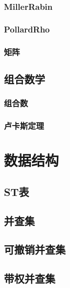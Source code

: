 \subsubsection{MillerRabin}


\subsubsection{PollardRho}


\subsubsection{矩阵}

\subsection{组合数学}
\subsubsection{组合数}

\subsubsection{卢卡斯定理}


\section{数据结构}
\subsection{ST表}


\subsection{并查集}


\subsection{可撤销并查集}

\subsection{带权并查集}


